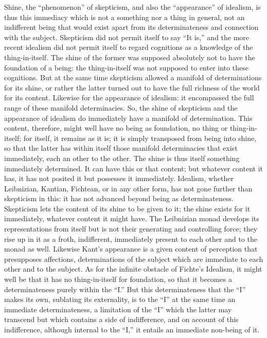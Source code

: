 Shine, the “phenomenon” of skepticism,
and also the “appearance” of idealism, is thus this immediacy
which is not a something nor a thing in general,
not an indifferent being that would exist apart from
its determinateness and connection with the subject.
Skepticism did not permit itself to say “It is,”
and the more recent idealism did not permit itself
to regard cognitions as a knowledge of the thing-in-itself.
The shine of the former was supposed absolutely
not to have the foundation of a being:
the thing-in-itself was not supposed
to enter into these cognitions.
But at the same time skepticism allowed
a manifold of determinations for its shine,
or rather the latter turned out to have
the full richness of the world for its content.
Likewise for the appearance of idealism:
it encompassed the full range of these manifold determinacies.
So, the shine of skepticism and the appearance of idealism
do immediately have a manifold of determination.
This content, therefore, might well have no being as foundation,
no thing or thing-in-itself;
for itself, it remains as it is;
it is simply transposed from being into shine,
so that the latter has within itself those manifold
determinacies that exist immediately,
each an other to the other.
The shine is thus itself something immediately determined.
It can have this or that content;
but whatever content it has, it has not posited it
but possesses it immediately.
Idealism, whether Leibnizian, Kantian, Fichtean, or in any
other form, has not gone further than skepticism in this:
it has not advanced beyond being as determinateness.
Skepticism lets the content of its shine to be given to it;
the shine exists for it immediately,
whatever content it might have.
The Leibnizian monad develops its representations from itself
but is not their generating and controlling force;
they rise up in it as a froth, indifferent,
immediately present to each other and to the monad as well.
Likewise Kant's appearance is a given content of perception that
presupposes affections, determinations of the subject which are immediate
to each other and to the subject.
As for the infinite obstacle of Fichte's Idealism,
it might well be that it has no thing-in-itself for foundation,
so that it becomes a determinateness purely within the “I.”
But this determinateness that the “I” makes its own,
sublating its externality,
is to the “I” at the same time an immediate determinateness,
a limitation of the “I” which the latter may transcend
but which contains a side of indifference,
and on account of this indifference,
although internal to the “I,”
it entails an immediate non-being of it.

